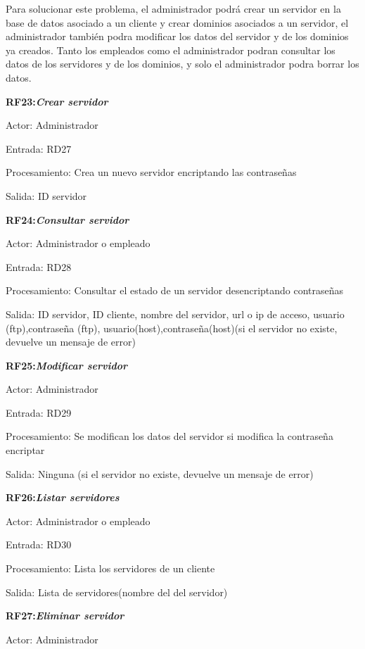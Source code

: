 \documentclass[paper=a4, fontsize=11pt, spanish]{scrartcl}
\begin{document}
Para solucionar este problema, el administrador podrá crear un servidor en la base de datos asociado a un cliente y crear dominios asociados a un servidor, el administrador también podra modificar los datos del servidor y de los dominios ya creados. Tanto los empleados como el administrador podran consultar los datos de los servidores y de los dominios, y solo el administrador podra borrar los datos.

\setlength{\parindent}{0em}
\textbf{RF23:\textit{Crear servidor}}
\setlength{\parindent}{3em}

Actor: Administrador

Entrada: RD27

Procesamiento: Crea un nuevo servidor encriptando las contraseñas

Salida: ID servidor

\setlength{\parindent}{0em}
\textbf{RF24:\textit{Consultar servidor}}
\setlength{\parindent}{3em}

Actor: Administrador o empleado

Entrada: RD28

Procesamiento: Consultar el estado de un servidor desencriptando contraseñas

Salida: ID servidor, ID cliente, nombre del servidor, url o ip de acceso, usuario (ftp),contraseña (ftp), usuario(host),contraseña(host)(si el servidor no existe, devuelve un mensaje de error)

\setlength{\parindent}{0em}
\textbf{RF25:\textit{Modificar servidor}}
\setlength{\parindent}{3em}

Actor: Administrador

Entrada: RD29

Procesamiento: Se modifican los datos del servidor si modifica la contraseña encriptar

Salida: Ninguna (si el servidor no existe, devuelve un mensaje de error)

\setlength{\parindent}{0em}
\textbf{RF26:\textit{Listar servidores}}
\setlength{\parindent}{3em}

Actor: Administrador o empleado

Entrada: RD30

Procesamiento: Lista los servidores de un cliente

Salida: Lista de servidores(nombre del del servidor)

\setlength{\parindent}{0em}
\textbf{RF27:\textit{Eliminar servidor}}
\setlength{\parindent}{3em}

Actor: Administrador
\end{document}
